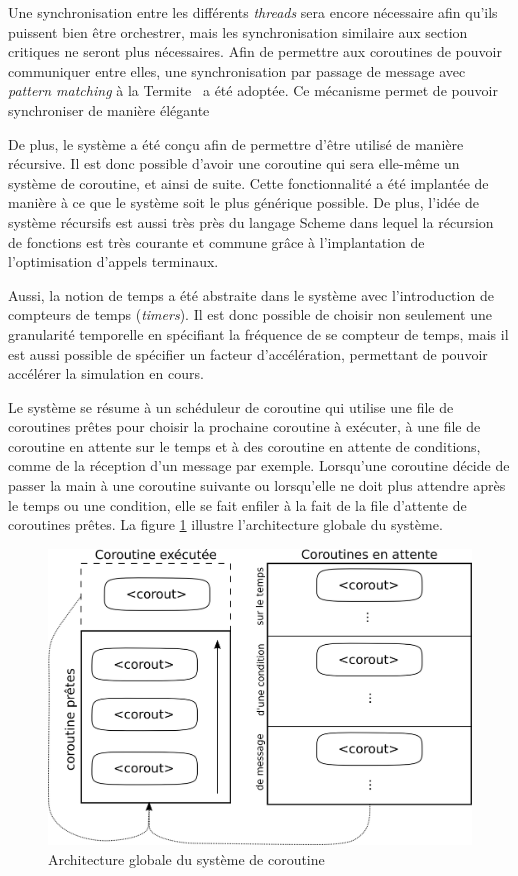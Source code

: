 \documentclass[12pt,oneside,letterpaper,francais]{book}
\begin{document}
Une synchronisation entre les différents \textit{threads} sera encore
nécessaire afin qu'ils puissent bien être orchestrer, mais les
synchronisation similaire aux section critiques ne seront plus
nécessaires. Afin de permettre aux coroutines de pouvoir communiquer
entre elles, une synchronisation par passage de message avec
\textit{pattern matching} à la Termite~\cite{Termite_paper} a été
adoptée. Ce mécanisme permet de pouvoir synchroniser de manière
élégante

De plus, le système a été conçu afin de permettre d'être utilisé de
manière récursive. Il est donc possible d'avoir une coroutine qui sera
elle-même un système de coroutine, et ainsi de suite. Cette
fonctionnalité a été implantée de manière à ce que le système soit le
plus générique possible. De plus, l'idée de système récursifs est
aussi très près du langage Scheme dans lequel la récursion de
fonctions est très courante et commune grâce à l'implantation de
l'optimisation d'appels terminaux.

Aussi, la notion de temps a été abstraite dans le système avec
l'introduction de compteurs de temps (\textit{timers}). Il est donc
possible de choisir non seulement une granularité temporelle en
spécifiant la fréquence de se compteur de temps, mais il est aussi
possible de spécifier un facteur d'accélération, permettant de pouvoir
accélérer la simulation en cours.

Le système se résume à un schéduleur de coroutine qui utilise une file
de coroutines prêtes pour choisir la prochaine coroutine à exécuter, à
une file de coroutine en attente sur le temps et à des coroutine en
attente de conditions, comme de la réception d'un message par
exemple. Lorsqu'une coroutine décide de passer la main à une coroutine
suivante ou lorsqu'elle ne doit plus attendre après le temps ou une
condition, elle se fait enfiler à la fait de la file d'attente de
coroutines prêtes. La figure \ref{Corout:system-schema} illustre
l'architecture globale du système.

\begin{figure}[htb!]
  \center
  \includegraphics[scale=0.7]{corout-system}
  \caption{Architecture globale du système de coroutine}
  \label{Corout:system-schema}
\end{figure}
\end{document}
